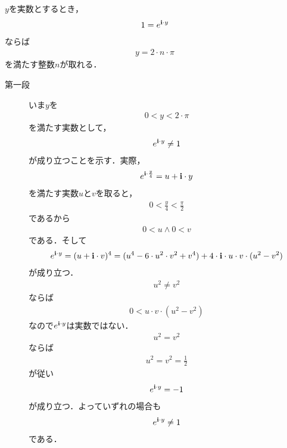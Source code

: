 	\begin{screen}
		\begin{thm}[$1 = e^{\isym \cdot y}$を満たす実数$y$は$2 \cdot \pi$の整数倍に限られる]
			$y$を実数とするとき，
			\begin{align}
				1 = e^{\mathbf{i} \cdot y}
			\end{align}
			ならば
			\begin{align}
				y = 2 \cdot n \cdot \pi
			\end{align}
			を満たす整数$n$が取れる．
		\end{thm}
	\end{screen}
	
	\begin{sketch}\mbox{}
		\begin{description}
			\item[第一段]
				いま$y$を
				\begin{align}
					0 < y < 2 \cdot \pi
				\end{align}
				を満たす実数として，
				\begin{align}
					e^{\mathbf{i} \cdot y} \neq 1
				\end{align}
				が成り立つことを示す．実際，
				\begin{align}
					e^{\mathbf{i} \cdot \frac{y}{4}}
					= u + \mathbf{i} \cdot y
				\end{align}
				を満たす実数$u$と$v$を取ると，
				\begin{align}
					0 < \frac{y}{4} < \frac{\pi}{2}
				\end{align}
				であるから
				\begin{align}
					0 < u \wedge 0 < v
				\end{align}
				である．そして
				\begin{align}
					e^{\mathbf{i} \cdot y} = (u + \mathbf{i} \cdot v)^4
					= (u^4 - 6 \cdot u^2 \cdot v^2 + v^4) 
					+ 4 \cdot \mathbf{i} \cdot u \cdot v \cdot (u^2 - v^2)
				\end{align}
				が成り立つ．
				\begin{align}
					u^2 \neq v^2
				\end{align}
				ならば
				\begin{align}
					0 < u \cdot v \cdot (u^2 - v^2)
				\end{align}
				なので$e^{\mathbf{i} \cdot y}$は実数ではない．
				\begin{align}
					u^2 = v^2
				\end{align}
				ならば
				\begin{align}
					u^2 = v^2 = \frac{1}{2}
				\end{align}
				が従い
				\begin{align}
					e^{\mathbf{i} \cdot y} = -1
				\end{align}
				が成り立つ．よっていずれの場合も
				\begin{align}
					e^{\mathbf{i} \cdot y} \neq 1
				\end{align}
				である．
				

\end{description}
\end{sketch}
